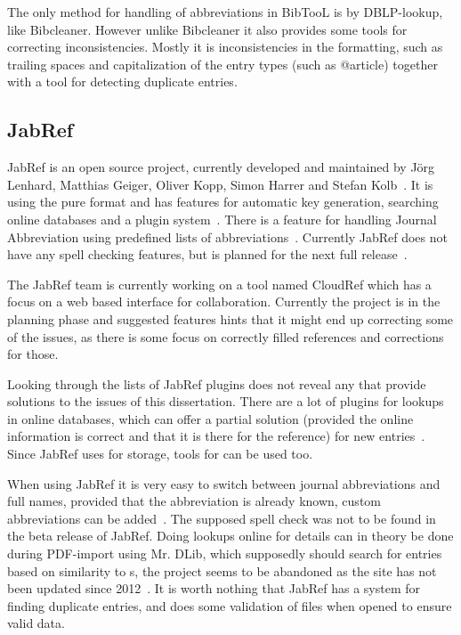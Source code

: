 The only method for handling of abbreviations in BibTooL is by
DBLP-lookup, like Bibcleaner.  However unlike Bibcleaner it also
provides some tools for correcting inconsistencies.  Mostly it is
inconsistencies in the formatting, such as trailing spaces and
capitalization of the entry types (such as @article) together with a
tool for detecting duplicate entries.

\subsection{JabRef}
JabRef is an open source project, currently developed and maintained
by Jörg Lenhard, Matthias Geiger, Oliver Kopp, Simon Harrer and Stefan
Kolb~\cite{jabref_developers}.  It is using the pure {\bibtex} format
and has features for automatic key generation, searching online
databases and a plugin system~\cite{jabref_features}.  There is a
feature for handling Journal Abbreviation using predefined lists of
abbreviations~\cite{jabref_abbreviations}.  Currently JabRef does not
have any spell checking features, but is planned for the next full
release~\cite{jabref_spellchecker}.

The JabRef team is currently working on a tool named CloudRef which
has a focus on a web based interface for collaboration.  Currently the
project is in the planning phase and suggested features hints that it
might end up correcting some of the issues, as there is some focus on
correctly filled {\bibtex} references and corrections for those.

Looking through the lists of JabRef plugins does not reveal any that
provide solutions to the issues of this dissertation.  There are a lot
of plugins for lookups in online databases, which can offer a partial
solution (provided the online information is correct and that it is
there for the reference) for new entries~\cite{jabref_resources}.
Since JabRef uses {\bibtex} for storage, tools for {\bibtex} can be
used too.

When using JabRef it is very easy to switch between journal
abbreviations and full names, provided that the abbreviation is
already known, custom abbreviations can be
added~\cite{jabref_abbreviations}.  The supposed spell check was not
to be found in the beta release of JabRef.  Doing lookups online for
details can in theory be done during PDF-import using Mr. DLib, which
supposedly should search for entries based on similarity to
s, the project seems to be abandoned as the site has not
been updated since 2012~\cite{jabref_mrdlib,jabref_mrdlib_notice}.  It
is worth nothing that JabRef has a system for finding duplicate
entries, and does some validation of {\bibtex} files when opened to
ensure valid data.

